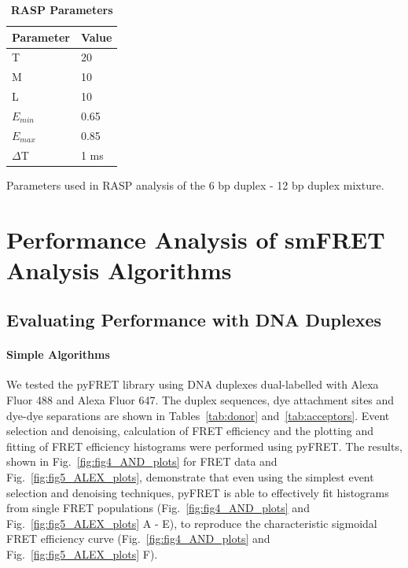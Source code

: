 \begin{table}[!ht]
\caption{
\bf{RASP Parameters}}
\begin{tabular}{|l|l|}
\hline
Parameter & Value \\
\hline
T & 20 \\
M & 10 \\
L & 10 \\
$E_{min}$ & 0.65 \\
$E_{max}$ & 0.85 \\
$\Delta$T & 1 ms \\
\hline
\end{tabular}
\begin{flushleft}
Parameters used in RASP analysis of the 6 bp duplex - 12 bp duplex mixture.
\end{flushleft}
\label{tab:RASP}
\end{table}

\section{Performance Analysis of smFRET Analysis Algorithms}

\subsection{Evaluating Performance with DNA Duplexes}
\paragraph{Simple Algorithms}
We tested the pyFRET library using DNA duplexes dual-labelled with Alexa Fluor 488 and Alexa Fluor 647. The duplex sequences, dye attachment sites and dye-dye separations are shown in Tables~\ref{tab:donor} and~\ref{tab:acceptors}. Event selection and denoising, calculation of FRET efficiency and the plotting and fitting of FRET efficiency histograms were performed using pyFRET. The results, shown in Fig.~\ref{fig:fig4_AND_plots} for FRET data and Fig.~\ref{fig:fig5_ALEX_plots}, demonstrate that even using the simplest event selection and denoising techniques, pyFRET is able to effectively fit histograms from single FRET populations (Fig.~\ref{fig:fig4_AND_plots} and Fig.~\ref{fig:fig5_ALEX_plots} A - E), to reproduce the characteristic sigmoidal FRET efficiency curve (Fig.~\ref{fig:fig4_AND_plots} and Fig.~\ref{fig:fig5_ALEX_plots} F).

